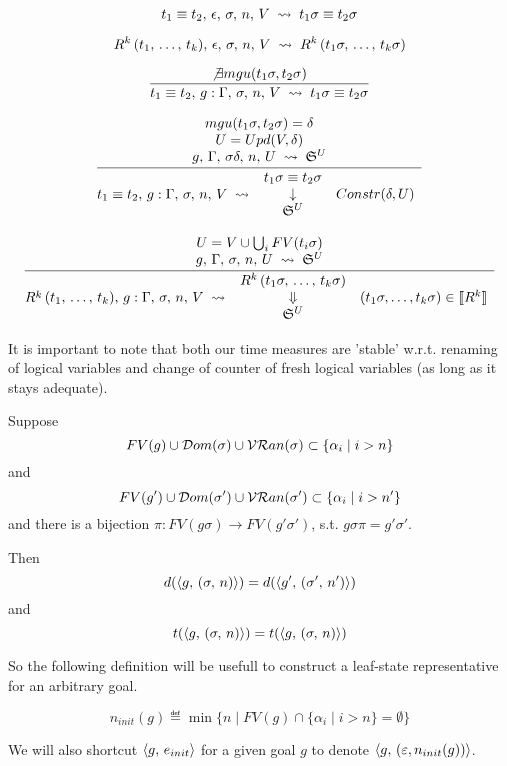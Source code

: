\[ t_1 \equiv t_2, \, \epsilon, \, \sigma, \, n, \, V \; \rightsquigarrow \; t_1 \sigma \equiv t_2 \sigma \]

\[ R^k\,(t_1, \, \dots, \, t_k), \, \epsilon, \, \sigma, \, n, \, V \; \rightsquigarrow \; R^k\,(t_1 \sigma, \, \dots, \, t_k \sigma) \]
		
\[ \frac{  \not\exists mgu(t_1 \sigma, t_2 \sigma)  }{  t_1 \equiv t_2, \, g : \Gamma, \, \sigma, \, n, \, V \; \rightsquigarrow \; t_1 \sigma \equiv t_2 \sigma } \]

\[ \frac{\begin{array}{c}   mgu(t_1 \sigma, t_2 \sigma) = \delta   \\   U = Upd(V, \delta)   \\   g, \, \Gamma, \, \sigma \delta, \, n, \, U \; \rightsquigarrow \; \mathfrak{S}^{U}   \end{array}}{  t_1 \equiv t_2, \, g : \Gamma, \, \sigma, \, n, \, V \; \rightsquigarrow \; \begin{array}{cl} t_1 \sigma \equiv t_2 \sigma \\ \downarrow & Constr(\delta, U) \\ \mathfrak{S}^{U} \end{array}   } \]
		
\[ \frac{\begin{array}{c}   U =  V \cup \bigcup_{i} FV(t_i \sigma)  \\   g, \, \Gamma, \, \sigma, \, n, \, U \; \rightsquigarrow \; \mathfrak{S}^{U}   \end{array}}{  R^k\,(t_1, \, \dots, \, t_k), \, g : \Gamma, \, \sigma, \, n, \, V \; \rightsquigarrow \;  \begin{array}{cl} R^k\,(t_1 \sigma, \, \dots, \, t_k \sigma) \\ \Downarrow &  (t_1 \sigma, \dots, t_k \sigma) \in \llbracket R^k \rrbracket   \\ \mathfrak{S}^{U} \end{array}   } \]

It is important to note that both our time measures are 'stable' w.r.t. renaming of logical variables and change of counter of fresh logical variables (as long as it stays adequate).

\begin{lemma}

Suppose \[ FV(g) \cup \mathcal{D}om(\sigma) \cup \mathcal{VR}an(\sigma) \subset \{ \alpha_i \mid i > n \} \]
and \[ FV(g') \cup \mathcal{D}om(\sigma') \cup \mathcal{VR}an(\sigma') \subset \{ \alpha_i \mid i > n' \} \]
and there is a bijection $\pi \colon FV(g \sigma) \to FV(g' \sigma')$, s.t. $g \sigma \pi = g' \sigma'$.

Then \[ d(\langle g ,\, (\sigma ,\, n) \rangle) = d(\langle g' ,\, (\sigma' ,\, n') \rangle) \] and \[ t(\langle g ,\, (\sigma ,\, n) \rangle) = t(\langle g ,\, (\sigma ,\, n) \rangle) \] 

\end{lemma}

So the following definition will be usefull to construct a leaf-state representative for an arbitrary goal.

\begin{definition}
\[ n_{init}(g) \eqdef \min \{ n \mid FV(g) \cap \{ \alpha_i \mid i > n \} = \emptyset \} \]

We will also shortcut $\langle g ,\, e_{init} \rangle$ for a given goal $g$ to denote $\langle g ,\, (\varepsilon, n_{init}(g)) \rangle$. 
\end{definition}
		

